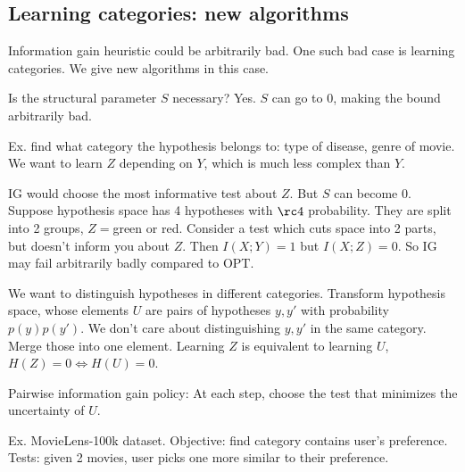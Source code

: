 \subsection{Learning categories: new algorithms}

Information gain heuristic could be arbitrarily bad. One such bad case is learning categories. We give new algorithms in this case.

Is the structural parameter $S$ necessary? Yes. %
$S$ can go to 0, making the bound arbitrarily bad.

Ex. find what category the hypothesis belongs to: type of disease, genre of movie. We want to learn $Z$ depending on $Y$, which is much less complex than $Y$. 

IG would choose the most informative test about $Z$. But $S$ can become 0. Suppose hypothesis space has 4 hypotheses with $\rc4$ probability. They are split into 2 groups, $Z=$green or red. Consider a test which cuts space into 2 parts, but doesn't inform you about $Z$. Then $I(X;Y)=1$ but $I(X;Z)=0$. So IG may fail arbitrarily badly compared to OPT.

We want to distinguish hypotheses in different categories. Transform hypothesis space, whose elements $U$ are pairs of hypotheses $y,y'$ with probability $p(y)p(y')$. We don't care about distinguishing $y,y'$ in the same category. Merge those into one element. 
Learning $Z$ is equivalent to learning $U$, $H(Z)=0\iff H(U)=0$. 

Pairwise information gain policy: At each step, choose the test that minimizes the uncertainty of $U$. 

Ex. MovieLens-100k dataset. Objective: find category contains user's preference. Tests: given 2 movies, user picks one more similar to their preference. 


